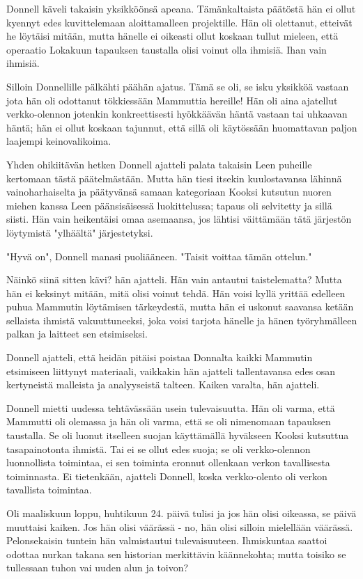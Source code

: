 Donnell käveli takaisin yksikköönsä apeana. Tämänkaltaista päätöstä hän ei ollut kyennyt edes kuvittelemaan aloittamalleen projektille. Hän oli olettanut, etteivät he löytäisi mitään, mutta hänelle ei oikeasti ollut koskaan tullut mieleen, että operaatio Lokakuun tapauksen taustalla olisi voinut olla ihmisiä. Ihan vain ihmisiä.


Silloin Donnellille pälkähti päähän ajatus. Tämä se oli, se isku yksikköä vastaan jota hän oli odottanut tökkiessään Mammuttia hereille! Hän oli aina ajatellut verkko-olennon jotenkin konkreettisesti hyökkäävän häntä vastaan tai uhkaavan häntä; hän ei ollut koskaan tajunnut, että sillä oli käytössään huomattavan paljon laajempi keinovalikoima.


Yhden ohikiitävän hetken Donnell ajatteli palata takaisin Leen puheille kertomaan tästä päätelmästään. Mutta hän tiesi itsekin kuulostavansa lähinnä vainoharhaiselta ja päätyvänsä samaan kategoriaan Kooksi kutsutun nuoren miehen kanssa Leen päänsisäisessä luokittelussa; tapaus oli selvitetty ja sillä siisti. Hän vain heikentäisi omaa asemaansa, jos lähtisi väittämään tätä järjestön löytymistä "ylhäältä" järjestetyksi.


"Hyvä on", Donnell manasi puoliääneen. "Taisit voittaa tämän ottelun."


Näinkö siinä sitten kävi? hän ajatteli. Hän vain antautui taistelematta? Mutta hän ei keksinyt mitään, mitä olisi voinut tehdä. Hän voisi kyllä yrittää edelleen puhua Mammutin löytämisen tärkeydestä, mutta hän ei uskonut saavansa ketään sellaista ihmistä vakuuttuneeksi, joka voisi tarjota hänelle ja hänen työryhmälleen palkan ja laitteet sen etsimiseksi.


Donnell ajatteli, että heidän pitäisi poistaa Donnalta kaikki Mammutin etsimiseen liittynyt materiaali, vaikkakin hän ajatteli tallentavansa edes osan kertyneistä malleista ja analyyseistä talteen. Kaiken varalta, hän ajatteli.




\psep Donnell mietti uudessa tehtävässään usein tulevaisuutta. Hän oli varma, että Mammutti oli olemassa ja hän oli varma, että se oli nimenomaan tapauksen taustalla. Se oli luonut itselleen suojan käyttämällä hyväkseen Kooksi kutsuttua tasapainotonta ihmistä. Tai ei se ollut edes suoja; se oli verkko-olennon luonnollista toimintaa, ei sen toiminta eronnut ollenkaan verkon tavallisesta toiminnasta. Ei tietenkään, ajatteli Donnell, koska verkko-olento oli verkon tavallista toimintaa.


Oli maaliskuun loppu, huhtikuun 24. päivä tulisi ja jos hän olisi oikeassa, se päivä muuttaisi kaiken. Jos hän olisi väärässä - no, hän olisi silloin mielellään väärässä. Pelonsekaisin tuntein hän valmistautui tulevaisuuteen. Ihmiskuntaa saattoi odottaa nurkan takana sen historian merkittävin käännekohta; mutta toisiko se tullessaan tuhon vai uuden alun ja toivon?






